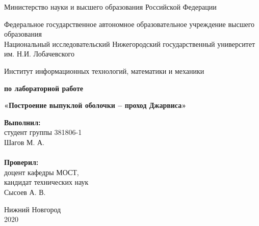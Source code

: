 \documentclass{report}
\begin{document}
\begin{titlepage}

\begin{center}
Министерство науки и высшего образования Российской Федерации
\end{center}

\begin{center}
Федеральное государственное автономное образовательное учреждение высшего образования \\
Национальный исследовательский Нижегородский государственный университет им. Н.И. Лобачевского
\end{center}

\begin{center}
Институт информационных технологий, математики и механики
\end{center}

\vspace{4em}

\begin{center}
\textbf{ по лабораторной работе} \\
\end{center}
\begin{center}
\textbf{\Large«Построение выпуклой оболочки – проход Джарвиса»} \\
\end{center}

\vspace{4em}

\newbox{\lbox}
\newlength{\maxl}
\setlength{\maxl}{\wd\lbox}
\hfill\parbox{7cm}{
\hspace*{5cm}\hspace*{-5cm}\textbf{Выполнил:} \\ студент группы 381806-1 \\ Шагов М. А.\\
\\
\hspace*{5cm}\hspace*{-5cm}\textbf{Проверил:}\\ доцент кафедры МОСТ, \\ кандидат технических наук \\ Сысоев А. В.\\
}
\vspace{\fill}

\begin{center} Нижний Новгород \\ 2020 \end{center}

\end{titlepage}
\end{document}
